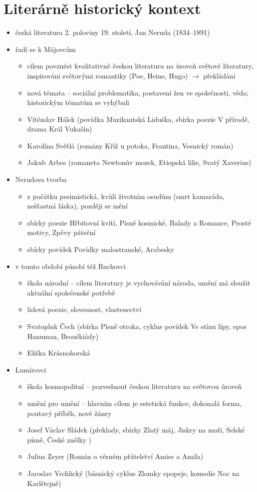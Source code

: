 \documentclass[10pt,a4paper]{article}
\newcommand{\ra}{$\rightarrow$ }
\begin{document}
\section*{Literárně historický kontext}
\begin{itemize}
\item česká literatura 2. poloviny 19. století, Jan Neruda (1834--1891)
\item řadí se k Májovcům
	\begin{itemize}
	\item cílem povznést kvalitativně českou literaturu na úroveň světové literatury, inspirováni světovými romantiky (Poe, Heine, Hugo) \ra překládání
	\item nová témata -- sociální problematika, postavení žen ve společnosti, věda; historickým tématům se vyhýbali
	\item Vítězslav Hálek (povídka Muzikantská Liduška, sbírka poezie V přírodě, drama Král Vukašín)
	\item Karolína Světlá (romány Kříž u potoka, Frantina, Vesnický román)
	\item Jakub Arbes (romaneta Newtonův mozek, Etiopská lilie, Svatý Xaverius)
	\end{itemize}
\item Nerudova tvorba
	\begin{itemize}
	\item z počátku pesimistická, kvůli životním osudům (smrt kamaráda, nešťastná láska), později se mění
	\item sbírky poezie Hřbitovní kvítí, Písně kosmické, Balady a Romance, Prosté motivy, Zpěvy páteční
	\item sbírky povídek Povídky malostranské, Arabesky
	\end{itemize}
\item v tomto období působí též Ruchovci
	\begin{itemize}
	\item škola národní -- cílem literatury je vychovávání národa, umění má sloužit aktuální společenské potřebě
	\item lidová poezie, slovesnost, vlastenectví
	\item Svatopluk Čech (sbírka Písně otroka, cyklus povídek Ve stínu lípy, epos Hanuman, Broučkiády)
	\item Eliška Krásnohorská 
	\end{itemize}
\item Lumírovci
	\begin{itemize}
	\item škola kosmopolitní -- pozvednout českou literaturu na světovou úroveň
	\item umění pro umění -- hlavním cílem je estetická funkce, dokonalá forma, poutavý příběh, nové žánry
	\item Josef Václav Sládek (překlady, sbírky Zlatý máj, Jiskry na moři, Selské písně, České znělky )
	\item Julius Zeyer (Román o věrném přátelství Amise a Amila)
	\item Jaroslav Vrchlický (básnický cyklus Zlomky epopeje, komedie Noc na Karlštejně)
	\end{itemize}
\end{itemize}
\end{document}
